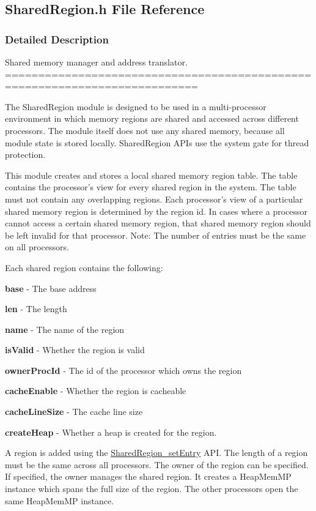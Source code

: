 \subsection{SharedRegion.h File Reference}
\label{_shared_region_8h}


\subsubsection{Detailed Description}
Shared memory manager and address translator. ===========================================================================

The SharedRegion module is designed to be used in a multi-\/processor environment in which memory regions are shared and accessed across different processors. The module itself does not use any shared memory, because all module state is stored locally. SharedRegion APIs use the system gate for thread protection.

This module creates and stores a local shared memory region table. The table contains the processor's view for every shared region in the system. The table must not contain any overlapping regions. Each processor's view of a particular shared memory region is determined by the region id. In cases where a processor cannot access a certain shared memory region, that shared memory region should be left invalid for that processor. Note: The number of entries must be the same on all processors.

Each shared region contains the following: \begin{DoxyItemize}
\item {\bfseries base} -\/ The base address \item {\bfseries len} -\/ The length \item {\bfseries name} -\/ The name of the region \item {\bfseries isValid} -\/ Whether the region is valid \item {\bfseries ownerProcId} -\/ The id of the processor which owns the region \item {\bfseries cacheEnable} -\/ Whether the region is cacheable \item {\bfseries cacheLineSize} -\/ The cache line size \item {\bfseries createHeap} -\/ Whether a heap is created for the region.\end{DoxyItemize}
A region is added using the \hyperlink{_shared_region_8h_a03f6986f76660e57a41ee312545e9f7d}{SharedRegion\_\-setEntry} API. The length of a region must be the same across all processors. The owner of the region can be specified. If specified, the owner manages the shared region. It creates a HeapMemMP instance which spans the full size of the region. The other processors open the same HeapMemMP instance.

